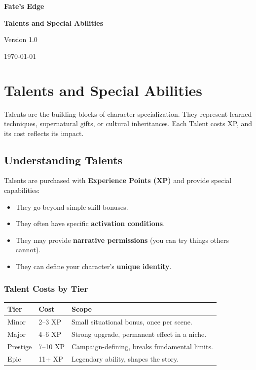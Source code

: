 \documentclass[12pt,a4paper]{book}
\begin{document}


\begin{titlepage}
    \centering
    \vspace*{2cm}
    {\Huge \textbf{Fate's Edge}\par}
    \vspace{1cm}
    {\Large \textbf{Talents and Special Abilities}\par}
    \vfill
    {\large Version 1.0\par}
    {\large \today\par}
\end{titlepage}
\clearpage

\chapter{Talents and Special Abilities}
\label{ch:talents}

Talents are the building blocks of character specialization. They represent learned techniques, supernatural gifts, or cultural inheritances. Each Talent costs XP, and its cost reflects its impact.

\section{Understanding Talents}
\label{sec:talents-understanding}

Talents are purchased with \textbf{Experience Points (XP)} and provide special capabilities:
\begin{itemize}
\item They go beyond simple skill bonuses.
\item They often have specific \textbf{activation conditions}.
\item They may provide \textbf{narrative permissions} (you can try things others cannot).
\item They can define your character's \textbf{unique identity}.
\end{itemize}

\subsection*{Talent Costs by Tier}
\label{sec:talent-costs}

\begin{center}
\begin{tabular}{lll}
\toprule
\textbf{Tier} & \textbf{Cost} & \textbf{Scope} \\
\midrule
Minor & 2--3 XP & Small situational bonus, once per scene. \\
Major & 4--6 XP & Strong upgrade, permanent effect in a niche. \\
Prestige & 7--10 XP & Campaign-defining, breaks fundamental limits. \\
Epic & 11+ XP & Legendary ability, shapes the story. \\
\bottomrule
\end{tabular}
\end{center}
\end{document}
